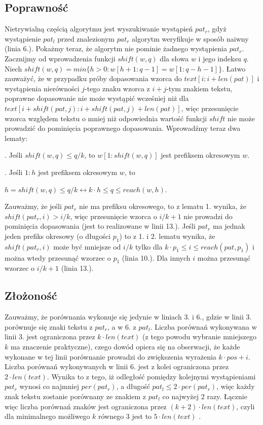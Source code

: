 \subsection{Poprawność}
Nietrywialną częścią algorytmu jest wyszukiwanie wystąpień $pat_{r}$, gdyż wystąpienie $pat_{l}$ przed znalezionym $pat_{r}$ algorytm weryfikuje w sposób naiwny (linia 6.). Pokażmy teraz, że algorytm nie pominie żadnego wystąpienia $pat_{r}$. Zacznijmy od wprowadzenia funkcji $shift(w,q)$ dla słowa $w$ i jego indeksu $q$. Niech $shift(w,q)=min\{h>0 \colon w[h+1:q-1]=w[1:q-h-1]\}$. Łatwo zauważyć, że w przypadku próby dopasowania wzorca do $text[i:i+len(pat)]$ i wystąpienia nierówności $j$-tego znaku wzorca z $i+j$-tym znakiem tekstu, poprawne dopasowanie nie może wystąpić wcześniej niż dla $text[i+shift(pat,j):i+shift(pat,j)+len(pat)]$, więc przesunięcie wzorca względem tekstu o mniej niż odpowiednia wartość funkcji $shift$ nie może prowadzić do pominięcia poprawnego dopasowania. Wprowadźmy teraz dwa lematy:

\begingroup
\leftskip \parindent

.
Jeśli $shift(w,q) \leq q/k$, to $w[1:shift(w,q)]$ jest prefiksem okresowym $w$.

.
Jeśli $1:h$ jest prefiksem okresowym $w$, to 

\noindent
$h = shift(w,q) \leq q/k \leftrightarrow k \cdot h \leq q \leq reach(w,h)$.

\endgroup

Zauważmy, że jeśli $pat_{r}$ nie ma prefiksu okresowego, to z lematu 1. wynika, że $shift(pat_{r}, i) > i/k$, więc przesunięcie wzorca o $i/k + 1$ nie prowadzi do pominięcia dopasowania (jest to realizowane w linii 13.). Jeśli $pat_{r}$ ma jednak jeden prefiks okresowy (o długości $p_{1}$) to z 1. i 2. lematu wynika, że $shift(pat_{r}, i)$ może być mniejsze od $i/k$ tylko dla $k \cdot p_{1} \leq i \leq reach(pat, p_{1})$ i można wtedy przesunąć wzorzec o $p_{1}$ (linia 10.). Dla innych $i$ można przesunąć wzorzec o $i/k + 1$ (linia 13.).

\subsection{Złożoność}
Zauważmy, że porównania wykonuje się jedynie w liniach 3. i 6., gdzie w linii 3. porównuje się znaki tekstu z $pat_{r}$, a w 6. z $pat_{l}$. Liczba porównań wykonywana w linii 3. jest ograniczona przez $k \cdot len(text)$ (z tego powodu wybranie mniejszego $k$ ma znaczenie praktyczne), czego dowód opiera się na obserwacji, że każde wykonane w tej linii porównanie prowadzi do zwiększenia wyrażenia $k \cdot pos + i$. Liczba porównań wykonywanych w linii 6. jest z kolei ograniczona przez $2 \cdot len(text)$. Wynika to z tego, iż odległość pomiędzy kolejnymi wystąpieniami $pat_{r}$ wynosi co najmniej $per(pat_{r})$, a długość $pat_{l} \leq 2 \cdot per(pat_{r})$, więc każdy znak tekstu zostanie porównany ze znakiem z $pat_{l}$ co najwyżej 2 razy. Łącznie więc liczba porównań znaków jest ograniczona przez $(k+2) \cdot len(text)$, czyli dla minimalnego możliwego $k$ równego 3 jest to $5 \cdot len(text)$ \cite{GS-CR}.

